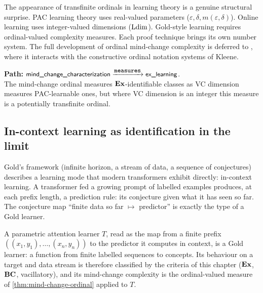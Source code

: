 \begin{remark}
\label{rmk:ordinals-surprise}
The appearance of transfinite ordinals in learning theory is a genuine structural surprise. PAC learning theory uses real-valued parameters ($\varepsilon, \delta, m(\varepsilon, \delta)$). Online learning uses integer-valued dimensions ($\mathrm{Ldim}$). Gold-style learning requires ordinal-valued complexity measures. Each proof technique brings its own number system. The full development of ordinal mind-change complexity is deferred to , where it interacts with the constructive ordinal notation systems of Kleene.
\end{remark}

\begin{traversal}
\textbf{Path:} $\nde{mind\_change\_characterization} \xrightarrow{\rel{measures}} \nde{ex\_learning}$.\\[3pt]
The mind-change ordinal measures $\mathbf{Ex}$-identifiable classes as VC dimension measures PAC-learnable ones, but where VC dimension is an integer this measure is a potentially transfinite ordinal.
\end{traversal}


\subsection{In-context learning as identification in the limit}
\label{sec:icl-gold}

Gold's framework (infinite horizon, a stream of data, a sequence of conjectures) describes a learning mode that modern transformers exhibit directly: in-context learning.  A transformer fed a growing prompt of labelled examples produces, at each prefix length, a prediction rule: its conjecture given what it has seen so far.  The conjecture map ``finite data so far $\mapsto$ predictor'' is exactly the type of a Gold learner.

\begin{prop}
\label{prop:transformer-gold}
A parametric attention learner $T$, read as the map from a finite prefix $((x_1,y_1),\dots,(x_n,y_n))$ to the predictor it computes in context, is a Gold learner: a function from finite labelled sequences to concepts. Its behaviour on a target and data stream is therefore classified by the criteria of this chapter ($\mathbf{Ex}$, $\mathbf{BC}$, vacillatory), and its mind-change complexity is the ordinal-valued measure of \cref{thm:mind-change-ordinal} applied to $T$.
\end{prop}

